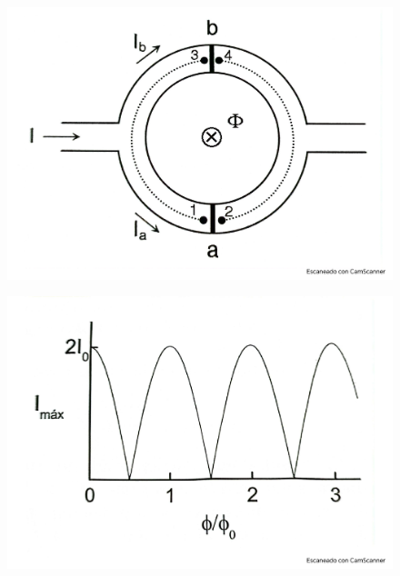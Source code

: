 \begin{figure}[h!] \centering
	\includegraphics[scale=0.5]{Cuerpo/Ch_11/Fotos libro 23.pdf}
	\caption{}
	\label{Fig:11-23}
\end{figure}
\begin{figure}[h!] \centering
	\includegraphics[scale=0.5]{Cuerpo/Ch_11/Fotos libro 24.pdf}
	\caption{}
	\label{Fig:11-24}
\end{figure}
